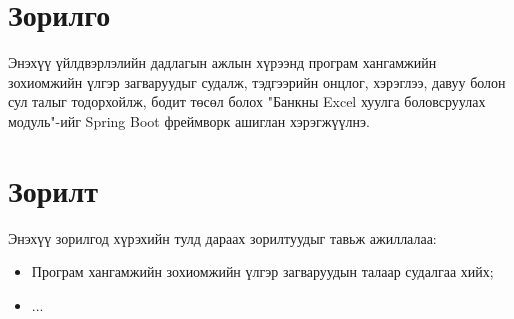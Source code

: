 \section{Зорилго}
	\quad \quad	Энэхүү үйлдвэрлэлийн дадлагын ажлын хүрээнд програм хангамжийн зохиомжийн үлгэр загваруудыг судалж, тэдгээрийн онцлог, хэрэглээ, давуу болон сул талыг тодорхойлж, бодит төсөл болох "Банкны Excel хуулга боловсруулах модуль"-ийг Spring Boot фреймворк ашиглан хэрэгжүүлнэ.

\section{Зорилт}
	\quad \quad	Энэхүү зорилгод хүрэхийн тулд дараах зорилтуудыг тавьж ажиллалаа:
	\begin{itemize}
		\item Програм хангамжийн зохиомжийн үлгэр загваруудын талаар судалгаа хийх;
		\item ...
	\end{itemize}
